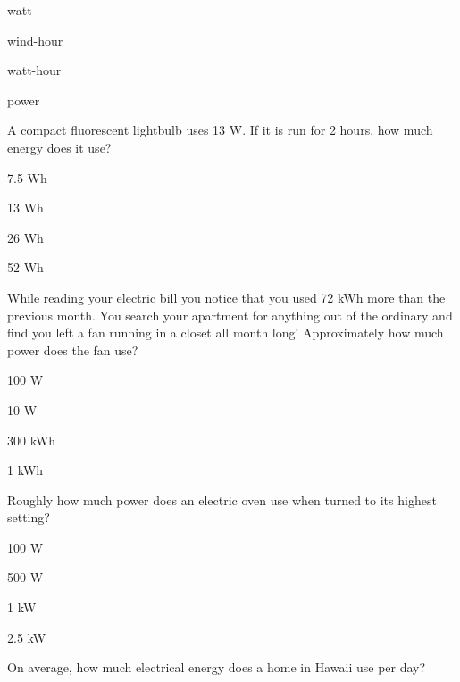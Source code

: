 \documentclass[11pt]{article}
\begin{document}
\begin{answer}
	\item watt
	\item wind-hour
	\item watt-hour
	\item power
\end{answer}

\pagebreak

\begin{question}
	\item A compact fluorescent lightbulb uses 13 W. If it is run for 2 hours, how much energy does it use?
\end{question}

\begin{answer}
	\item 7.5 Wh
	\item 13 Wh
	\item 26 Wh
	\item 52 Wh
\end{answer}

\begin{question}
	\item While reading your electric bill you notice that you used 72 kWh more than the previous month. You search your apartment for anything out of the ordinary and find you left a fan running in a closet all month long! Approximately how much power does the fan use?
\end{question}

\begin{answer}
	\item 100 W
	\item 10 W
	\item 300 kWh
	\item 1 kWh
\end{answer}

\begin{question}
	\item Roughly how much power does an electric oven use when turned to its highest setting?
\end{question}

\begin{answer}
	\item 100 W
	\item 500 W
	\item 1 kW
	\item 2.5 kW
\end{answer}

\begin{question}
	\item On average, how much electrical energy does a home in Hawaii use per day?
\end{question}
\end{document}

